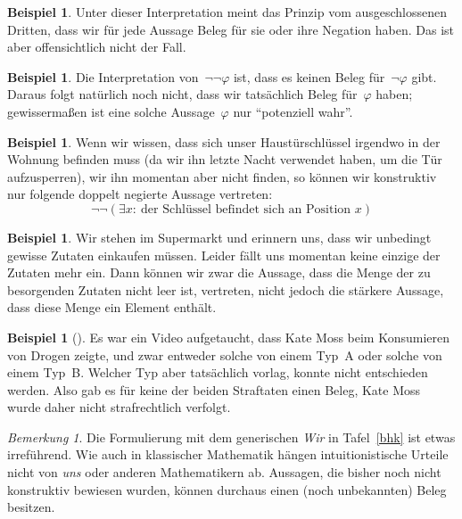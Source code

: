 \documentclass[a4paper,ngerman,12pt]{scrartcl}
\theoremstyle{definition}
\newtheorem{bsp}[defn]{Beispiel}
\theoremstyle{plain}
\theoremstyle{remark}
\newtheorem{bem}[defn]{Bemerkung}
\renewcommand{\_}{\mathpunct{.}\,}
\newcommand{\?}{\,{:}\,}
\begin{document}
\begin{bsp}
Unter dieser Interpretation meint das Prinzip vom ausgeschlossenen Dritten, dass wir für jede
Aussage Beleg für sie oder ihre Negation haben. Das ist aber offensichtlich
nicht der Fall.
\end{bsp}

\begin{bsp}
Die Interpretation von~$\neg\neg\varphi$ ist, dass es keinen Beleg
für~$\neg\varphi$ gibt. Daraus folgt natürlich noch nicht, dass wir tatsächlich
Beleg für~$\varphi$ haben; gewissermaßen ist eine solche Aussage~$\varphi$ nur
"`potenziell wahr"'.
\end{bsp}

\begin{bsp}Wenn wir wissen, dass sich unser Haustürschlüssel irgendwo in der
Wohnung befinden muss (da wir ihn letzte Nacht verwendet haben, um die Tür
aufzusperren), wir ihn momentan aber nicht finden, so können wir konstruktiv
nur folgende doppelt negierte Aussage vertreten:
\[ \neg\neg (\exists x{:}\ \text{der Schlüssel befindet sich an Position~$x$})
\]
\end{bsp}

\begin{bsp}Wir stehen im Supermarkt und erinnern uns, dass wir unbedingt
gewisse Zutaten einkaufen müssen. Leider fällt uns momentan keine einzige der
Zutaten mehr ein. Dann können wir zwar die Aussage, dass die Menge der zu
besorgenden Zutaten nicht leer ist, vertreten, nicht jedoch die stärkere
Aussage, dass diese Menge ein Element enthält.\end{bsp}

\begin{bsp}[\cite{sigfpe:katemoss,bbc:katemoss}]
Es war ein Video aufgetaucht, dass Kate Moss beim Konsumieren von Drogen zeigte,
und zwar entweder solche von einem Typ~A oder solche von einem Typ~B. Welcher
Typ aber tatsächlich vorlag, konnte nicht entschieden werden. Also gab es für
keine der beiden Straftaten einen Beleg, Kate Moss wurde daher nicht
strafrechtlich verfolgt.
\end{bsp}

\begin{bem}Die Formulierung mit dem generischen \emph{Wir} in Tafel~\ref{bhk}
ist etwas irreführend. Wie auch in klassischer Mathematik hängen
intuitionistische Urteile nicht von \emph{uns} oder anderen Mathematikern ab.
Aussagen, die bisher noch nicht konstruktiv bewiesen wurden, können
durchaus einen (noch unbekannten) Beleg besitzen.
\end{bem}
\end{document}
